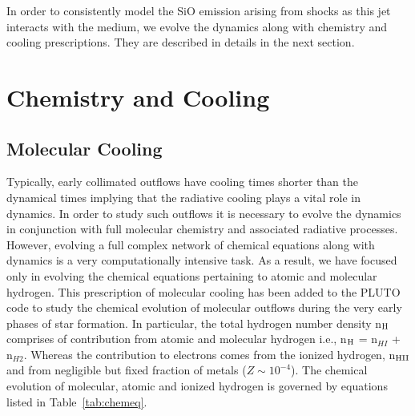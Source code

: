 \documentclass[useAMS,usenatbib,letters]{mn2e}
\begin{document}
%
 
In order to consistently model the SiO emission arising from shocks as
this jet interacts with the medium, we evolve the dynamics along with
chemistry and cooling prescriptions. They are described in details in
the next section.




\section{Chemistry and Cooling}
\label{sec:chem}
\subsection{Molecular Cooling}
\label{ssec:molcool}
Typically, early collimated outflows have cooling times shorter than
the dynamical times implying that the radiative cooling plays a vital
role in dynamics. In order to study such outflows it is necessary to evolve
the dynamics in conjunction with full molecular chemistry and
associated radiative processes. However, evolving a full complex
network of chemical equations along with dynamics is a very
computationally intensive task. As a result, we have focused only in
evolving the chemical equations pertaining to atomic and molecular
hydrogen. This prescription of molecular cooling has been added to the PLUTO
code to study the chemical evolution of molecular outflows during the
very early phases of star formation. In particular, the total hydrogen
number density n$_{\rm H}$ comprises of contribution from atomic and
molecular hydrogen i.e., n$_{\rm H}$ = n$_{HI}$ + n$_{H2}$. Whereas
the contribution to electrons comes from the ionized hydrogen, n$_{\rm HII}$ and
from negligible but fixed fraction of metals ($Z \sim 10^{-4}$).
The chemical evolution of molecular, atomic and ionized hydrogen is governed by
equations listed in Table~\ref{tab:chemeq}. 
%
\end{document}
